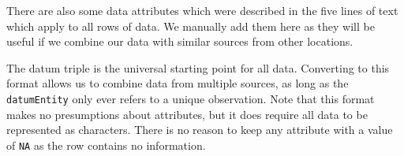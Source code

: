 \documentclass{article}
\newenvironment{Shaded}{\begin{snugshade}}{\end{snugshade}}
\newcommand{\AttributeTok}[1]{\textcolor[rgb]{0.77,0.63,0.00}{#1}}
\newcommand{\CommentTok}[1]{\textcolor[rgb]{0.56,0.35,0.01}{\textit{#1}}}
\newcommand{\DecValTok}[1]{\textcolor[rgb]{0.00,0.00,0.81}{#1}}
\newcommand{\FloatTok}[1]{\textcolor[rgb]{0.00,0.00,0.81}{#1}}
\newcommand{\FunctionTok}[1]{\textcolor[rgb]{0.00,0.00,0.00}{#1}}
\newcommand{\NormalTok}[1]{#1}
\newcommand{\OtherTok}[1]{\textcolor[rgb]{0.56,0.35,0.01}{#1}}
\newcommand{\SpecialCharTok}[1]{\textcolor[rgb]{0.00,0.00,0.00}{#1}}
\newcommand{\StringTok}[1]{\textcolor[rgb]{0.31,0.60,0.02}{#1}}
\begin{document}
\begin{Shaded}
\end{Shaded}

There are also some data attributes which were described in the five lines of text which apply to all rows of data. We manually add them here as they will be useful if we combine our data with similar sources from other locations.

\begin{Shaded}
\end{Shaded}

The datum triple is the universal starting point for all data. Converting to this format allows us to combine data from multiple sources, as long as the \texttt{datumEntity} only ever refers to a unique observation. Note that this format makes no presumptions about attributes, but it does require all data to be represented as characters. There is no reason to keep any attribute with a value of \texttt{NA} as the row contains no information.
\end{document}
